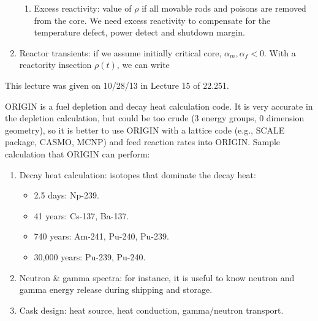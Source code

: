 \documentclass{school-22.211-notes}
\begin{document}
\begin{enumerate}
\begin{enumerate}
\item Excess reactivity: value of $\rho$ if all movable rods and
  poisons are removed from the core. We need excess reactivity to
  compensate for the temperature defect, power detect and shutdown
  margin.
\end{enumerate}

\item Reactor transients: if we assume initially critical core,
  $\alpha_m, \alpha_f < 0$. With a reactority insection $\rho(t)$, we
  can write 
\end{enumerate}



This lecture was given on 10/28/13 in Lecture 15 of 22.251. 

ORIGIN is a fuel depletion and decay heat calculation code. It is very
accurate in the depletion calculation, but could be too crude (3
energy groups, 0 dimension geometry), so it is better to use ORIGIN
with a lattice code (e.g., SCALE package, CASMO, MCNP) and feed
reaction rates into ORIGIN. Sample calculation that ORIGIN can
perform:

\begin{enumerate}

\item Decay heat calculation: isotopes that dominate the decay heat: 

\begin{itemize}
\item 2.5 days: Np-239. 
\item 41 years: Cs-137, Ba-137. 
\item 740 years: Am-241, Pu-240, Pu-239. 
\item 30,000 years: Pu-239, Pu-240. 
\end{itemize}


\item Neutron \& gamma spectra: for instance, it is useful to know
  neutron and gamma energy release during shipping and storage.

\item Cask design: heat source, heat conduction, gamma/neutron transport. 
\end{enumerate}




\clearpage
\end{document}
